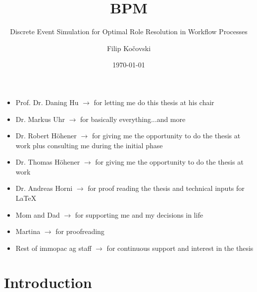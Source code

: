 \documentclass{seal_thesis}
\date{\today}
\title{BPM}
\subtitle{Discrete Event Simulation for Optimal Role Resolution in Workflow Processes}
\author{Filip Ko\v{c}ovski}
\begin{document}
\maketitle

\frontmatter

\begin{acknowledgements}

\begin{itemize}
	\item Prof. Dr. Daning Hu $\rightarrow$ for letting me do this thesis at his chair
	\item Dr. Markus Uhr $\rightarrow$ for basically everything...and more
	\item Dr. Robert H\"ohener $\rightarrow$ for giving me the opportunity to do the thesis at work plus consulting me during the initial phase
	\item Dr. Thomas H\"ohener $\rightarrow$ for giving me the opportunity to do the thesis at work
	\item Dr. Andreas Horni $\rightarrow$ for proof reading the thesis and technical inputs for \LaTeX 
	\item Mom and Dad $\rightarrow$ for supporting me and my decisions in life
	\item Martina $\rightarrow$ for proofreading
	\item Rest of immopac ag staff $\rightarrow$ for continuous support and interest in the thesis
\end{itemize}

\end{acknowledgements}

\begin{abstract}

\end{abstract}

\begin{zusammenfassung}

\end{zusammenfassung}

\tableofcontents

\clearpage

\listoffigures

\clearpage

\listoftables

\mainmatter

\chapter{Introduction}
\label{ch:intro}
\end{document}
